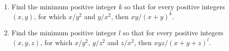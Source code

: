 \begin{enumerate}[label = (\alph*)]
	\item Find the minimum positive integer $k$ so that for every positive integers $(x, y)$, for which $x/y^2$ and $y/x^2$, then $xy/(x+y)^k$.
	\item Find the minimum positive integer $l$ so that for every positive integers $(x, y, z)$, for which $x/y^2$, $y/z^2$ and $z/x^2$, then $xyz/(x+y+z)^l$.
\end{enumerate}
